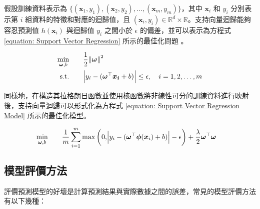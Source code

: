 假設訓練資料表示為 $\{ (\boldsymbol{x}_1, y_1), (\boldsymbol{x}_2, y_2), \ldots, (\boldsymbol{x}_{m}, y_m) \}$，其中 $\boldsymbol{x}_i$ 和 $y_i$ 分別表示第 $i$ 組資料的特徵和對應的迴歸值，且 $(\boldsymbol{x}_{i}, y_i ) \in \mathbb{R}^d \times \mathbb{R}$。支持向量迴歸能夠容忍預測值 $h(\boldsymbol{x}_i)$ 與迴歸值 $y_i$ 之間小於 $\epsilon$ 的偏差，並可以表示為方程式 \eqref{equation: Support Vector Regression} 所示的最佳化問題 \cite{drucker1997support}。

\begin{equation}\label{equation: Support Vector Regression}
  \begin{aligned}
    \min_{\boldsymbol{\omega}, b}   \qquad & \frac{1}{2} \norm{\boldsymbol{\omega}}^2 \\
    \text{s.t.}                     \qquad & \abs{y_i - (\boldsymbol{\omega}^{\top} \boldsymbol{x_i} + b)} \leq \epsilon ,\quad i = 1, 2, \ldots, m
  \end{aligned}
\end{equation}

同樣地，在構造其拉格朗日函數並使用核函數將非線性可分的訓練資料進行映射後，支持向量迴歸可以形式化為方程式 \eqref{equation: Support Vector Regression Model} 所示的最佳化模型。

\begin{equation}\label{equation: Support Vector Regression Model}
  \begin{aligned}
    \min_{\boldsymbol{\omega}, b}   \qquad & \frac{1}{m} \sum_{i = 1}^{m} \max{\left(0, \abs{y_i - (\boldsymbol{\omega}^{\top} \boldsymbol{\phi}(\boldsymbol{x}_i) + b)} - \epsilon \right)} + \frac{\lambda}{2} \boldsymbol{\omega}^{\top}\boldsymbol{\omega}
  \end{aligned}
\end{equation}

\subsection{模型評價方法}

評價預測模型的好壞是計算預測結果與實際數據之間的誤差，常見的模型評價方法有以下幾種：

